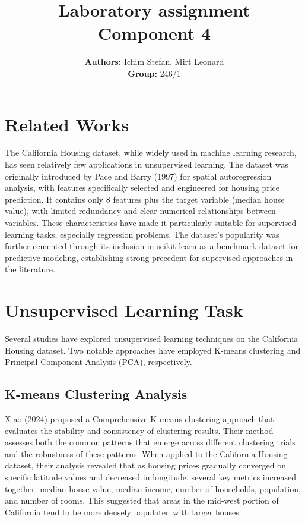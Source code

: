 \documentclass[a4paper, 11pt]{article}
\title{\textbf{Laboratory assignment} \\[1ex] \large \textbf{Component} {4}}
\author{\textbf{Authors:} {Ichim Stefan, Mirt Leonard}\\ \textbf{Group:} {246/1}}
\begin{document}
\maketitle

\section*{Related Works}
The California Housing dataset, while widely used in machine learning research, has seen relatively few applications in unsupervised learning.
The dataset was originally introduced by Pace and Barry (1997) for spatial autoregression analysis, with features specifically selected and engineered for housing price prediction. It contains only 8 features plus the target variable (median house value), with limited redundancy and clear numerical relationships between variables. These characteristics have made it particularly suitable for supervised learning tasks, especially regression problems. The dataset's popularity was further cemented through its inclusion in scikit-learn as a benchmark dataset for predictive modeling, establishing strong precedent for supervised approaches in the literature.

\section{Unsupervised Learning Task}

Several studies have explored unsupervised learning techniques on the California Housing dataset. Two notable approaches have employed K-means clustering and Principal Component Analysis (PCA), respectively.

\subsection{K-means Clustering Analysis}
Xiao (2024) proposed a Comprehensive K-means clustering approach that evaluates the stability and consistency of clustering results. Their method assesses both the common patterns that emerge across different clustering trials and the robustness of these patterns. When applied to the California Housing dataset, their analysis revealed that as housing prices gradually converged on specific latitude values and decreased in longitude, several key metrics increased together: median house value, median income, number of households, population, and number of rooms. This suggested that areas in the mid-west portion of California tend to be more densely populated with larger houses.
\end{document}
